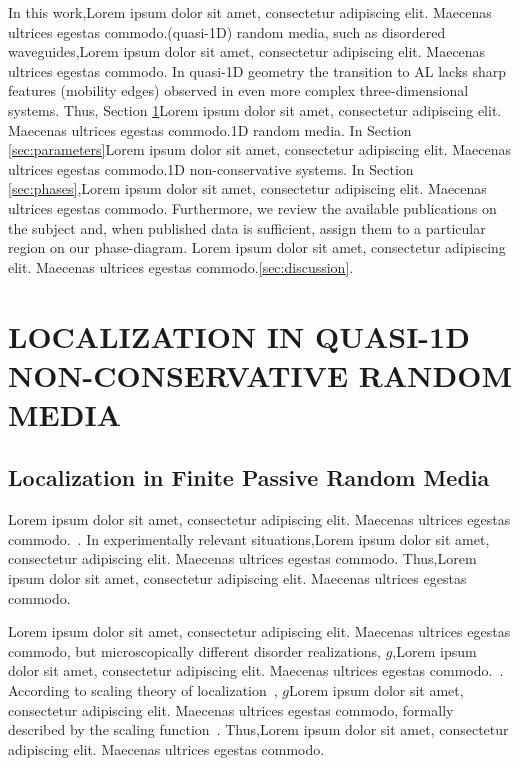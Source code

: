In this work,Lorem ipsum dolor sit amet, consectetur adipiscing elit. Maecenas ultrices egestas commodo.(quasi-1D) random media, such as disordered waveguides,Lorem ipsum dolor sit amet, consectetur adipiscing elit. Maecenas ultrices egestas commodo. In quasi-1D geometry the transition to AL lacks sharp features (mobility edges) observed in even more complex three-dimensional systems. Thus,  Section \ref{sec:q1d_localization}Lorem ipsum dolor sit amet, consectetur adipiscing elit. Maecenas ultrices egestas commodo.1D random media. In Section \ref{sec:parameters}Lorem ipsum dolor sit amet, consectetur adipiscing elit. Maecenas ultrices egestas commodo.1D non-conservative systems. In Section \ref{sec:phases},Lorem ipsum dolor sit amet, consectetur adipiscing elit. Maecenas ultrices egestas commodo. Furthermore, we review the available publications on the subject and, when published data is sufficient, assign them to a particular region on our phase-diagram. Lorem ipsum dolor sit amet, consectetur adipiscing elit. Maecenas ultrices egestas commodo.\ref{sec:discussion}.

\section{LOCALIZATION IN QUASI-1D NON-CONSERVATIVE RANDOM MEDIA}
\label{sec:q1d_localization}

\subsection{Localization in Finite Passive Random Media}

Lorem ipsum dolor sit amet, consectetur adipiscing elit. Maecenas ultrices egestas commodo.~\cite{2010_Spencer}. In experimentally relevant situations,Lorem ipsum dolor sit amet, consectetur adipiscing elit. Maecenas ultrices egestas commodo. Thus,Lorem ipsum dolor sit amet, consectetur adipiscing elit. Maecenas ultrices egestas commodo. 

Lorem ipsum dolor sit amet, consectetur adipiscing elit. Maecenas ultrices egestas commodo, but microscopically different disorder realizations, $g$,Lorem ipsum dolor sit amet, consectetur adipiscing elit. Maecenas ultrices egestas commodo.~\cite{1977_Thouless}. According to scaling theory of localization~\cite{1979_Anderson}, $g$Lorem ipsum dolor sit amet, consectetur adipiscing elit. Maecenas ultrices egestas commodo, formally described by the scaling function~\cite{2010_Kramer}. Thus,Lorem ipsum dolor sit amet, consectetur adipiscing elit. Maecenas ultrices egestas commodo.

